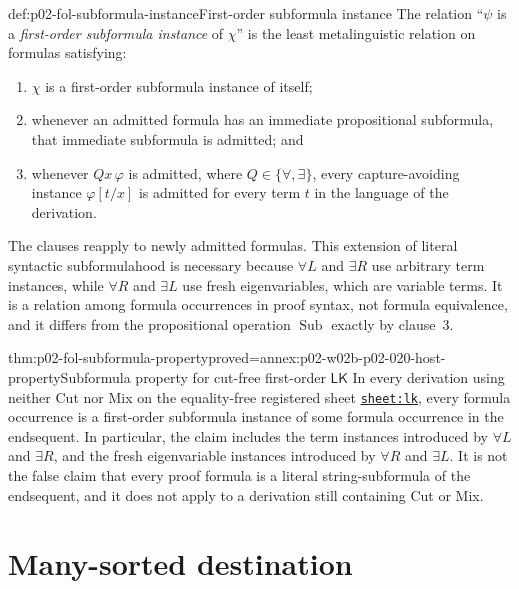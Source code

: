 \begin{hbdefinition}{def:p02-fol-subformula-instance}{First-order subformula instance}
The relation ``\(\psi\) is a \emph{first-order subformula instance} of
\(\chi\)'' is the least metalinguistic relation on formulas satisfying:
\begin{enumerate}
  \item \(\chi\) is a first-order subformula instance of itself;
  \item whenever an admitted formula has an immediate propositional
        subformula, that immediate subformula is admitted; and
  \item whenever \(Qx\,\varphi\) is admitted, where
        \(Q\in\{\forall,\exists\}\), every capture-avoiding instance
        \(\varphi[t/x]\) is admitted for every term \(t\) in the language of
        the derivation.
\end{enumerate}
The clauses reapply to newly admitted formulas.  This extension of literal
syntactic subformulahood is necessary because \(\forall L\) and \(\exists R\)
use arbitrary term instances, while \(\forall R\) and \(\exists L\) use fresh
eigenvariables, which are variable terms.  It is a relation among formula
occurrences in proof syntax, not formula equivalence, and it differs from the
propositional operation \(\operatorname{Sub}\) exactly by clause~3.
\end{hbdefinition}

\begin{hbtheorem}{thm:p02-fol-subformula-property}{proved=annex:p02-w02b-p02-020-host-property}{Subformula property for cut-free first-order \(\mathsf{LK}\)}
In every derivation using neither Cut nor Mix on the equality-free registered
sheet \hyperref[sheet:lk]{\texttt{sheet:lk}}, every formula occurrence is a
first-order subformula instance of some formula occurrence in the endsequent.
In particular, the claim includes the term instances introduced by
\(\forall L\) and \(\exists R\), and the fresh eigenvariable instances
introduced by \(\forall R\) and \(\exists L\).  It is not the false claim that
every proof formula is a literal string-subformula of the endsequent, and it
does not apply to a derivation still containing Cut or Mix.
\end{hbtheorem}

\section{Many-sorted destination}
\label{sec:p02-first-order-depth-pointers}

